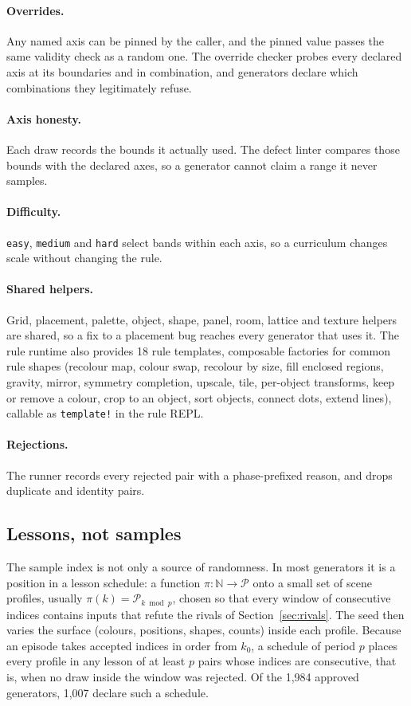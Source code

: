 \documentclass[11pt]{article}
\begin{document}
\paragraph{Overrides.} Any named axis can be pinned by the caller, and the pinned
value passes the same validity check as a random one. The override checker probes
every declared axis at its boundaries and in combination, and generators declare
which combinations they legitimately refuse.

\paragraph{Axis honesty.} Each draw records the bounds it actually used. The
defect linter compares those bounds with the declared axes, so a generator cannot
claim a range it never samples.

\paragraph{Difficulty.} \texttt{easy}, \texttt{medium} and \texttt{hard} select
bands within each axis, so a curriculum changes scale without changing the rule.

\paragraph{Shared helpers.} Grid, placement, palette, object, shape, panel, room,
lattice and texture helpers are shared, so a fix to a placement bug reaches every
generator that uses it. The rule runtime also provides 18 rule templates, composable
factories for common rule shapes (recolour map, colour swap, recolour by size,
fill enclosed regions, gravity, mirror, symmetry completion, upscale, tile,
per-object transforms, keep or remove a colour, crop to an object, sort objects,
connect dots, extend lines), callable as \texttt{template!} in the rule REPL.

\paragraph{Rejections.} The runner records every rejected pair with a
phase-prefixed reason, and drops duplicate and identity pairs.

\subsection{Lessons, not samples}

The sample index is not only a source of randomness. In most generators it is a
position in a lesson schedule: a function $\pi:\mathbb{N}\to\mathcal{P}$ onto a
small set of scene profiles, usually $\pi(k)=\mathcal{P}_{k \bmod p}$, chosen
so that every window of consecutive indices contains inputs that refute the
rivals of Section~\ref{sec:rivals}. The seed then varies the surface (colours,
positions, shapes, counts) inside each profile. Because an episode takes accepted indices in order from $k_0$, a schedule of
period $p$ places every profile in any lesson of at least $p$ pairs whose indices
are consecutive, that is, when no draw inside the window was rejected. Of the 1,984 approved generators, 1,007 declare such a schedule.
\end{document}
